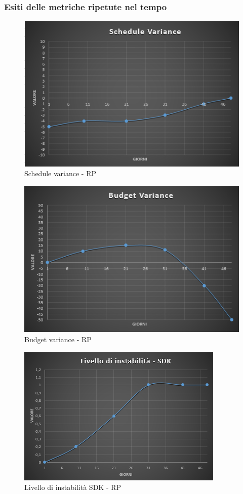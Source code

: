 \subsubsection{Esiti delle metriche ripetute nel tempo}

\begin{figure}[H]
	\centering 
	\includegraphics[scale=0.7]{Sezioni/Immagini/ScheduleVariance-RP}
	\caption{Schedule variance - RP}
\end{figure}

\begin{figure}[H]
	\centering 
	\includegraphics[scale=0.7]{Sezioni/Immagini/BudgetVariance-RP}
	\caption{Budget variance - RP}
\end{figure}

\begin{figure}[H]
	\centering 
	\includegraphics[scale=0.85]{Sezioni/Immagini/LivelloInstabilitaSDK-RP}
	\caption{Livello di instabilità SDK - RP}
\end{figure}

